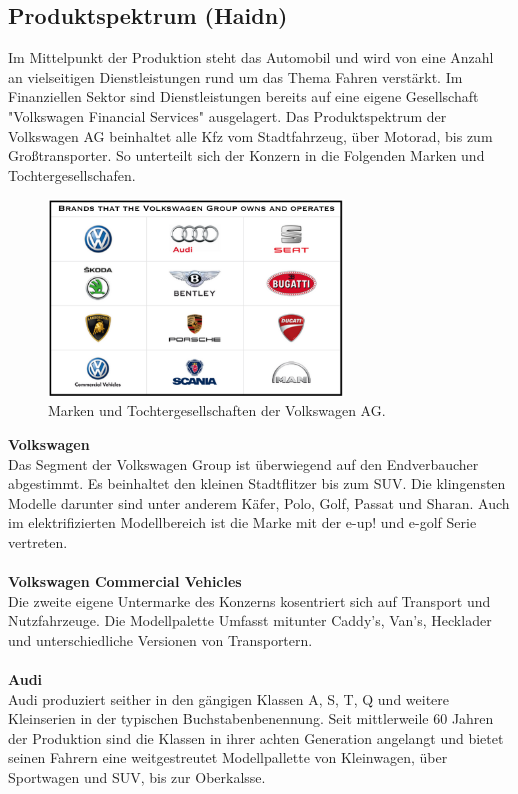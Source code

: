 \documentclass[12pt]{article}
\begin{document}
\subsection{Produktspektrum (Haidn)}
Im Mittelpunkt der Produktion steht das Automobil und wird von eine Anzahl an vielseitigen Dienstleistungen rund um das Thema Fahren verstärkt. Im Finanziellen Sektor sind Dienstleistungen bereits auf eine eigene Gesellschaft "Volkswagen Financial Services" ausgelagert.
Das Produktspektrum der Volkswagen AG beinhaltet alle Kfz vom Stadtfahrzeug, über Motorad, bis zum Großtransporter.
So unterteilt sich der Konzern in die Folgenden Marken und Tochtergesellschafen.\\
\begin{figure}[here!]
\centering
\includegraphics[width=0.7\textwidth]{images/Volkswagen-Group-Brands}
\caption{Marken und Tochtergesellschaften der Volkswagen AG. \cite{marken}}
\end{figure}\FloatBarrier
\noindent
\textbf{Volkswagen}\\
Das Segment der Volkswagen Group ist überwiegend auf den Endverbaucher abgestimmt. Es beinhaltet den kleinen Stadtflitzer bis zum SUV. Die klingensten Modelle darunter sind unter anderem Käfer, Polo, Golf, Passat und Sharan.
Auch im elektrifizierten Modellbereich ist die Marke mit der e-up! und e-golf Serie vertreten.\\
\\
\textbf{Volkswagen Commercial Vehicles}\\
Die zweite eigene Untermarke des Konzerns kosentriert sich auf Transport und Nutzfahrzeuge. Die Modellpalette Umfasst mitunter Caddy's, Van's, Hecklader und unterschiedliche Versionen von Transportern.\\
\\
\textbf{Audi}\\
Audi produziert seither in den gängigen Klassen A, S, T, Q und weitere Kleinserien in der typischen Buchstabenbenennung. Seit mittlerweile 60 Jahren der Produktion sind die Klassen in ihrer achten Generation angelangt und bietet seinen Fahrern eine weitgestreutet Modellpallette von Kleinwagen, über Sportwagen und SUV, bis zur Oberkalsse.\\
\end{document}
